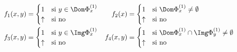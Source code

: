 \documentclass[fleqn, 11pt]{article}
\newcommand{\indef}{\uparrow}
\begin{document}
\begin{align*}
	f_1(x, y) &=
	\begin{cases}
		1      & \text{si } y \in \Dom \Phi^{(1)}_x \\
		\indef & \text{si no}
	\end{cases} &
	f_2(x) &=
	\begin{cases}
		1      & \text{si } \Dom \Phi^{(1)}_x \neq \emptyset \\
		\indef & \text{si no}
	\end{cases} \\
	f_3(x, y) &=
	\begin{cases}
		1      & \text{si } y \in \Img \Phi^{(1)}_x \\
		\indef & \text{si no}
	\end{cases} &
	f_4(x, y) &=
	\begin{cases}
		1      & \text{si } \Dom \Phi^{(1)}_x \cap \Img \Phi^{(1)}_y
		                    \neq \emptyset \\
		\indef & \text{si no}
	\end{cases}
\end{align*}
\end{document}
